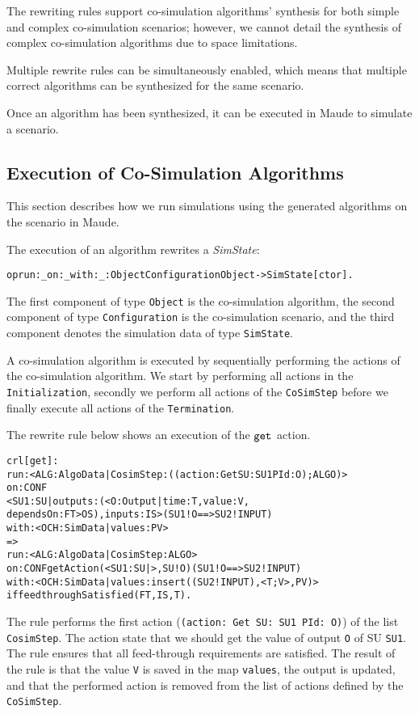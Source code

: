 The rewriting rules support co-simulation algorithms' synthesis for both simple and complex co-simulation scenarios; however, we cannot detail the synthesis of complex co-simulation algorithms due to space limitations.

Multiple rewrite rules can be simultaneously enabled, which means that multiple correct algorithms can be synthesized for the same scenario.

Once an algorithm has been synthesized, it can be executed in Maude to simulate a scenario.

\subsection{Execution of Co-Simulation Algorithms}
This section describes how we run simulations using the generated algorithms on the scenario in Maude.

The execution of an algorithm rewrites a \emph{SimState}:
\small
\begin{alltt}
op run:_on:_with:_ : Object Configuration Object -> SimState [ctor]. 
\end{alltt}
\normalsize
The first component of type \texttt{Object} is the co-simulation algorithm, the second component of type \texttt{Configuration} is the co-simulation scenario, and the third component denotes the simulation data of type \texttt{SimState}.

A co-simulation algorithm is executed by sequentially performing the actions of the co-simulation algorithm.
We start by performing all actions in the \texttt{Initialization}, secondly we perform all actions of the \texttt{CoSimStep} before we finally execute all actions of the \texttt{Termination}. 

The rewrite rule below shows an execution of the $\mathtt{get}_{}$ action.
\small
\begin{alltt}
crl [get] : 
run: < ALG : AlgoData | CosimStep : ((action: Get SU: SU1 PId: O) ; ALGO) >
on: CONF
< SU1 : SU | outputs : (< O : Output | time : T, value : V, 
  dependsOn : FT > OS), inputs : IS > ( SU1 ! O ==> SU2 ! INPUT)
with: < OCH : SimData | values : PV >
=> 
run: < ALG : AlgoData | CosimStep : ALGO >
on: CONF getAction(< SU1 : SU | >, SU ! O) ( SU1 ! O ==> SU2 ! INPUT)
with: < OCH : SimData | values : insert((SU2 ! INPUT), < T ; V >, PV) > 
if feedthroughSatisfied(FT, IS, T) .
\end{alltt}
\normalsize
The rule performs the first action (\texttt{(action: Get SU: SU1 PId: O)}) of the list \texttt{CosimStep}.
The action state that we should get the value of output \texttt{O} of SU \texttt{SU1}.
The rule ensures that all feed-through requirements are satisfied.
The result of the rule is that the value \texttt{V} is saved in the map \texttt{values}, the output is updated, and that the performed action is removed from the list of actions defined by the \texttt{CoSimStep}.

